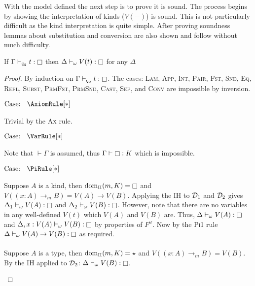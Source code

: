 With the model defined the next step is to prove it is sound.
The process begins by showing the interpretation of kinds ($V(-)$) is sound.
This is not particularly difficult as the kind interpretation is quite simple.
After proving soundness lemmas about substitution and conversion are also shown and follow without much difficulty.

\begin{theorem}[Soundness of $V$]
    \label{lem:3:soudness_of_v}
    If $\Gamma \vdash_{\ced} t : \kind$ then $\Delta \vdash_\omega V(t) : \kind$ for any $\Delta$
\end{theorem}
\begin{proof}
    By induction on $\Gamma \vdash_{\ced} t : \kind$.
    The cases: \textsc{Lam}, \textsc{App}, \textsc{Int}, \textsc{Pair}, \textsc{Fst}, \textsc{Snd}, \textsc{Eq}, \textsc{Refl}, \textsc{Subst}, \textsc{PrmFst}, \textsc{PrmSnd}, \textsc{Cast}, \textsc{Sep}, and \textsc{Conv} are impossible by inversion.

    $\text{Case: }\begin{array}{c} \AxiomRule[*] \end{array}$
    \begin{proofcase}
        Trivial by the \textsc{Ax} rule.
    \end{proofcase}

    $\text{Case: }\begin{array}{c} \VarRule[*] \end{array}$
    \begin{proofcase}
        Note that $\vdash \Gamma$ is assumed, thus $\Gamma \vdash \kind : K$ which is impossible.
    \end{proofcase}

    $\text{Case: }\begin{array}{c} \PiRule[*] \end{array}$
    \begin{proofcase}
        Suppose $A$ is a kind, then $\pdom(m, K) = \kind$ and $V((x : A) \to_m B) = V(A) \to V(B)$.
        Applying the IH to $\mathcal{D}_{1}$ and $\mathcal{D}_{2}$ gives $\Delta_1 \vdash_\omega V(A) : \kind$ and $\Delta_2 \vdash_\omega V(B) : \kind$.
        However, note that there are no variables in any well-defined $V(t)$ which $V(A)$ and $V(B)$ are.
        Thus, $\Delta \vdash_\omega V(A) : \kind$ and $\Delta, x : V(A) \vdash_\omega V(B) : \kind$ by properties of $F^\omega$.
        Now by the \textsc{Pi1} rule $\Delta \vdash_\omega V(A) \to V(B) : \kind$ as required.
        \\ \\
        Suppose $A$ is a type, then $\textnormal{dom}_\Pi(m, K) = \star$ and $V((x : A) \to_m B) = V(B)$.
        By the IH applied to $\mathcal{D}_{2}$: $\Delta \vdash_\omega V(B) : \kind$.
    \end{proofcase}
\end{proof}

